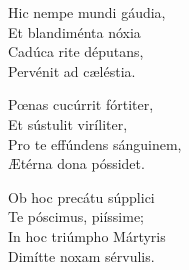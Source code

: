 Hic nempe mundi gáudia,\\
Et blandiménta nóxia\\
Cadúca rite députans,\\
Pervénit ad cæléstia.

Pœnas cucúrrit fórtiter,\\
Et sústulit viríliter,\\
Pro te effúndens sánguinem,\\
Ætérna dona póssidet.

Ob hoc precátu súpplici\\
Te póscimus, piíssime;\\
In hoc triúmpho Mártyris\\
Dimítte noxam sérvulis.